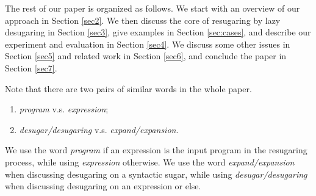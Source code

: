 The rest of our paper is organized as follows. We start with an overview of our approach in Section \ref{sec2}. We then discuss the core of resugaring by lazy desugaring in Section \ref{sec3}, give examples in Section \ref{sec:cases}, and describe our experiment and evaluation in Section \ref{sec4}. We discuss some other issues in Section \ref{sec5} and related work in Section \ref{sec6}, and conclude the paper in Section \ref{sec7}.

Note that there are two pairs of similar words in the whole paper.
\begin{enumerate}
	\item \emph{program} v.s. \emph{expression};
	\item \emph{desugar/desugaring} v.s. \emph{expand/expansion}.
\end{enumerate}
We use the word \emph{program} if an expression is the input program in the  resugaring process, while using \emph{expression} otherwise. We use the word \emph{expand/expansion} when discussing desugaring on a syntactic sugar, while using \emph{desugar/desugaring} when discussing desugaring on an expression or else.

